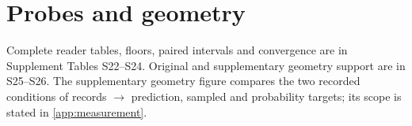 \clearpage
\section{Probes and geometry}\label{app:probes}

Complete reader tables, floors, paired intervals and convergence are in Supplement
Tables S22--S24. Original and supplementary geometry support are in S25--S26.
The supplementary geometry figure compares the two recorded conditions of
records $\to$ prediction, sampled and probability targets; its scope is
stated in \cref{app:measurement}.

